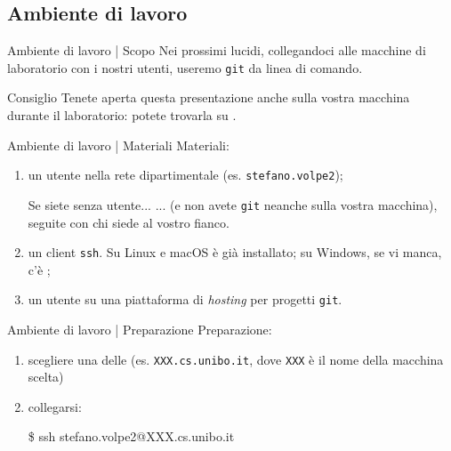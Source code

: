 \documentclass{beamer}
\begin{document}
\subsection{Ambiente di lavoro}
\begin{frame}{Ambiente di lavoro | Scopo}
  Nei prossimi lucidi, collegandoci alle macchine di laboratorio con i nostri
  utenti, useremo \texttt{git} da linea di comando.\pause
  \begin{block}{Consiglio}
    Tenete aperta questa presentazione anche sulla vostra macchina durante il
    laboratorio: potete trovarla su
    \href{https://dynamik.vercel.app/lab}{}.
  \end{block}
\end{frame}

\begin{frame}{Ambiente di lavoro | Materiali}
  Materiali:
  \begin{enumerate}
    \item<1->un utente nella rete dipartimentale (es. \texttt{stefano.volpe2});
      \begin{alertblock}{Se siete senza utente...}
        ... (e non avete \texttt{git} neanche sulla vostra macchina), seguite con
        chi siede al vostro fianco.
      \end{alertblock}\pause
    \item<2->un client \texttt{ssh}. Su Linux e macOS è già installato; su
      Windows, se vi manca, c'è
      \href{https://www.chiark.greenend.org.uk/~sgtatham/putty/latest.html}{};
    \item<3->un utente su una piattaforma di \emph{hosting} per progetti
      \texttt{git}.
  \end{enumerate}
\end{frame}

\begin{frame}{Ambiente di lavoro | Preparazione}
  Preparazione:
  \begin{enumerate}
    \item<1->scegliere una delle \href{https://disi.unibo.it/it/dipartimento/servizi-tecnici-e-amministrativi/servizi-informatici/accesso-remoto}{} (es. \texttt{XXX.cs.unibo.it}, dove \texttt{XXX} è il
      nome della macchina scelta)
    \item<2-> collegarsi:
      \begin{semiverbatim}
        \$ ssh stefano.volpe2@XXX.cs.unibo.it
      \end{semiverbatim}
  \end{enumerate}
\end{frame}
\end{document}
